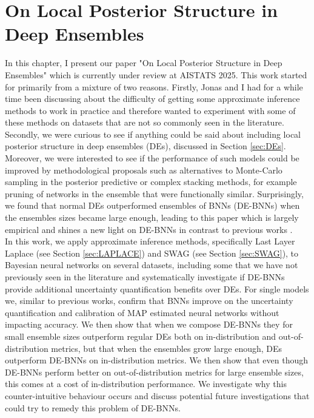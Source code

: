 \chapter{On Local Posterior Structure in Deep Ensembles}
\label{chap:AISTATS}
In this chapter, I present our paper "On Local Posterior Structure in Deep Ensembles" which is currently under review at AISTATS 2025. This work started for primarily from a mixture of two reasons. Firstly, Jonas and I had for a while time been discussing about the difficulty of getting some approximate inference methods to work in practice and therefore wanted to experiment with some of these methods on datasets that are not so commonly seen in the literature. Secondly, we were curious to see if anything could be said about including local posterior structure in deep ensembles (DEs), discussed in Section \ref{sec:DEs}. Moreover, we were interested to see if the performance of such models could be improved by methodological proposals such as alternatives to Monte-Carlo sampling in the posterior predictive or complex stacking methods, for example pruning of networks in the ensemble that were functionally similar. Surprisingly, we found that normal DEs outperformed ensembles of BNNs (DE-BNNs) when the ensembles sizes became large enough, leading to this paper which is largely empirical and shines a new light on DE-BNNs in contrast to previous works \citep{2021_MOLA, 2020_MultiSWAG}.\\

\noindent In this work, we apply approximate inference methods, specifically Last Layer Laplace (see Section \ref{sec:LAPLACE}) and SWAG (see Section \ref{sec:SWAG}), to Bayesian neural networks on several datasets, including some that we have not previously seen in the literature and systematically investigate if DE-BNNs provide additional uncertainty quantification benefits over DEs. For single models we, similar to previous works, confirm that BNNs improve on the uncertainty quantification and calibration of MAP estimated neural networks without impacting accuracy. We then show that when we compose DE-BNNs they for small ensemble sizes outperform regular DEs both on in-distribution and out-of-distribution metrics, but that when the ensembles grow large enough, DEs outperform DE-BNNs on in-distribution metrics. We then show that even though DE-BNNs perform better on out-of-distribution metrics for large ensemble sizes, this comes at a cost of in-distribution performance. We investigate why this counter-intuitive behaviour occurs and discuss potential future investigations that could try to remedy this problem of DE-BNNs.

